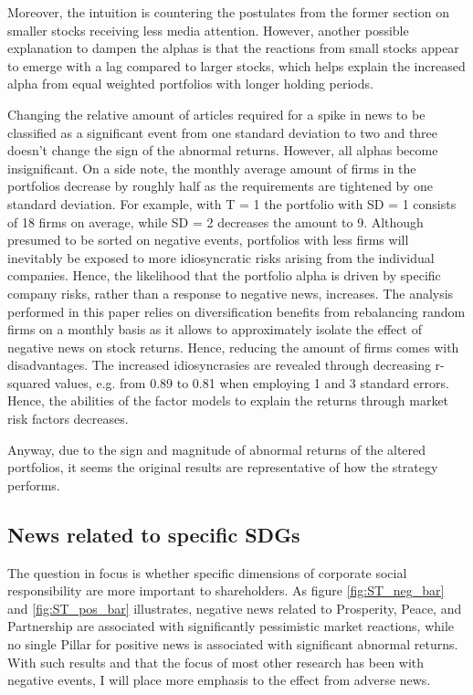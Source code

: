 Moreover, the intuition is countering the postulates from the former section on smaller stocks receiving less media attention. However, another possible explanation to dampen the alphas is that the reactions from small stocks appear to emerge with a lag compared to larger stocks, which helps explain the increased alpha from equal weighted portfolios with longer holding periods. 


Changing the relative amount of articles required for a spike in news to be classified as a significant event from one standard deviation to two and three doesn't change the sign of the abnormal returns. However, all alphas become insignificant. On a side note, the monthly average amount of firms in the portfolios decrease by roughly half as the requirements are tightened by one standard deviation. For example, with T = 1 the portfolio with SD = 1 consists of 18 firms on average, while SD = 2 decreases the amount to 9. Although presumed to be sorted on negative events, portfolios with less firms will inevitably be exposed to more idiosyncratic risks arising from the individual companies. Hence, the likelihood that the portfolio alpha is driven by specific company risks, rather than a response to negative news, increases. The analysis performed in this paper relies on diversification benefits from rebalancing random firms on a monthly basis as it allows to approximately isolate the effect of negative news on stock returns. Hence, reducing the amount of firms comes with disadvantages. The increased idiosyncrasies are revealed through decreasing r-squared values, e.g. from 0.89 to 0.81 when employing 1 and 3 standard errors. Hence, the abilities of the factor models to explain the returns through market risk factors decreases. 

Anyway, due to the sign and magnitude of abnormal returns of the altered portfolios, it seems the original results are representative of how the strategy performs. 


\subsection{News related to specific SDGs}

The question in focus is whether specific dimensions of corporate social responsibility are more important to shareholders. As figure \ref{fig:ST_neg_bar} and \ref{fig:ST_pos_bar} illustrates, negative news related to Prosperity, Peace, and Partnership are associated with significantly pessimistic market reactions, while no single Pillar for positive news is associated with significant abnormal returns. With such results and that the focus of most other research has been with negative events, I will place more emphasis to the effect from adverse news.

